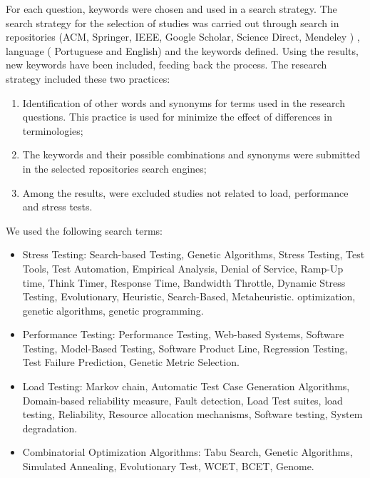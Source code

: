 For each question, keywords were chosen and used in a search strategy. The search strategy for the selection of studies was carried out through search in repositories (ACM, Springer, IEEE, Google Scholar, Science Direct, Mendeley ) , language ( Portuguese and English) and the keywords defined. Using the results, new keywords have been included, feeding back the process. The research strategy included these two practices:


\begin{enumerate}
\item Identification of other words and synonyms for terms used in the research questions. This practice is used for minimize the effect of differences in terminologies;
\item The keywords and their possible combinations and synonyms were submitted in the selected repositories search engines; 
\item  Among the results, were excluded studies not related to load, performance and stress tests.
\end{enumerate}




We used the following search terms:

\begin{itemize}

\item Stress Testing: Search-based Testing, Genetic Algorithms, Stress Testing, Test Tools, Test Automation, Empirical Analysis, Denial of Service, Ramp-Up time, Think Timer,  Response Time, Bandwidth Throttle, Dynamic Stress Testing, Evolutionary, Heuristic, Search-Based, Metaheuristic. optimization, genetic algorithms, genetic programming.
\item Performance Testing: Performance Testing, Web-based Systems, Software Testing, Model-Based Testing, Software Product Line, Regression Testing, Test Failure Prediction, Genetic Metric Selection.
\item Load Testing: Markov chain,  Automatic Test Case Generation Algorithms, Domain-based reliability measure, Fault detection, Load Test suites, load testing, Reliability, Resource allocation mechanisms, Software testing, System degradation.
\item Combinatorial Optimization Algorithms: Tabu Search, Genetic Algorithms, Simulated Annealing, Evolutionary Test, WCET, BCET, Genome.
\end{itemize}

